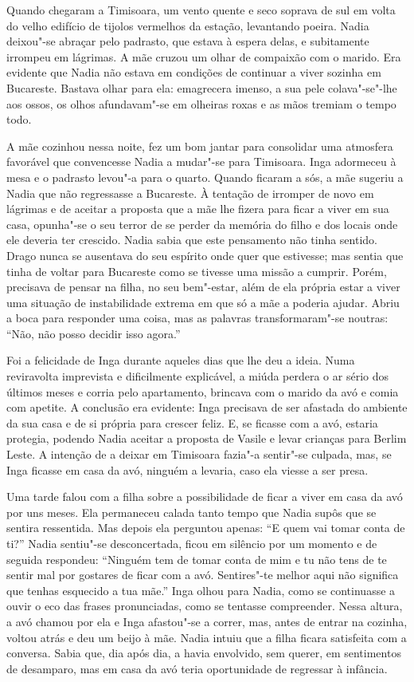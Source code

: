 Quando chegaram a Timisoara, um vento quente e seco soprava de sul em
volta do velho edifício de tijolos vermelhos da estação, levantando
poeira. Nadia deixou"-se abraçar pelo padrasto, que estava à espera
delas, e subitamente irrompeu em lágrimas. A mãe cruzou um olhar de compaixão com o marido. Era evidente que Nadia não estava em condições de
continuar a viver sozinha em Bucareste. Bastava olhar para ela:
emagrecera imenso, a sua pele colava"-se"-lhe aos ossos, os olhos
afundavam"-se em olheiras roxas e as mãos tremiam o tempo todo.

A mãe cozinhou nessa noite, fez um bom jantar para consolidar uma
atmosfera favorável que convencesse Nadia a mudar"-se para Timisoara.
Inga adormeceu à mesa e o padrasto levou"-a para o quarto. Quando ficaram
a sós, a mãe sugeriu a Nadia que não regressasse a Bucareste. À tentação de irromper de novo em lágrimas e de aceitar a proposta que a
mãe lhe fizera para ficar a viver em sua casa, opunha"-se o seu terror de
se perder da memória do filho e dos locais onde ele deveria ter
crescido. Nadia sabia que este pensamento não tinha sentido. Drago nunca
se ausentava do seu espírito onde quer que estivesse; mas sentia que
tinha de voltar para Bucareste como se tivesse uma missão a cumprir.
Porém, precisava de pensar na filha, no seu bem"-estar, além de ela
própria estar a viver uma situação de instabilidade extrema em que só a
mãe a poderia ajudar. Abriu a boca para responder uma coisa, mas as
palavras transformaram"-se noutras: ``Não, não posso decidir isso
agora.''

Foi a felicidade de Inga durante aqueles dias que lhe deu a ideia. Numa
reviravolta imprevista e dificilmente explicável, a miúda perdera o ar
sério dos últimos meses e corria pelo apartamento, brincava com o marido
da avó e comia com apetite. A conclusão era evidente: Inga precisava
de ser afastada do ambiente da sua casa e de si própria para crescer
feliz. E, se ficasse com a avó, estaria protegia, podendo Nadia aceitar
a proposta de Vasile e levar crianças para Berlim Leste. A intenção de a
deixar em Timisoara fazia"-a sentir"-se culpada, mas, se Inga ficasse em
casa da avó, ninguém a levaria, caso ela viesse a ser presa.

Uma tarde
falou com a filha sobre a possibilidade de ficar a viver em casa da avó
por uns meses. Ela permaneceu calada tanto tempo que Nadia supôs que se
sentira ressentida. Mas depois ela perguntou apenas: ``E quem vai tomar
conta de ti?'' Nadia sentiu"-se desconcertada, ficou em silêncio por um
momento e de seguida respondeu: ``Ninguém tem de tomar conta de mim e
tu não tens de te sentir mal por gostares de ficar com a avó.
Sentires"-te melhor aqui não significa que tenhas esquecido a tua mãe.''
Inga olhou para Nadia, como se continuasse a ouvir o eco das frases
pronunciadas, como se tentasse compreender. Nessa altura, a avó chamou
por ela e Inga afastou"-se a correr, mas, antes de entrar na cozinha,
voltou atrás e deu um beijo à mãe. Nadia intuiu que a filha ficara
satisfeita com a conversa. Sabia que, dia após dia, a havia envolvido,
sem querer, em sentimentos de desamparo, mas em casa da avó
teria oportunidade de regressar à infância.

